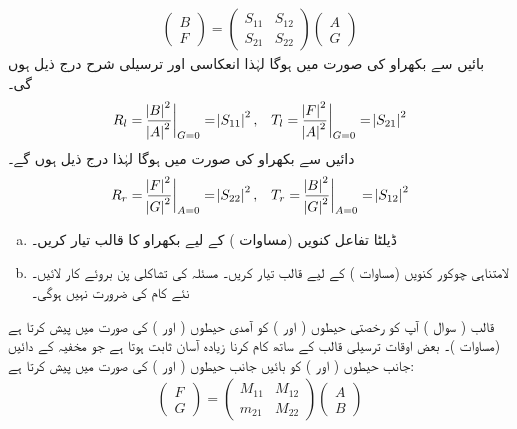 \begin{align}\label{مساوات_غیر_تابع_شروڈنگر_قالب_بکھراو_بی_ایف}
	\begin{pmatrix}
		B\\
		F
	\end{pmatrix}
	=
	\begin{pmatrix}
		S_{11} & S_{12}\\
		S_{21} & S_{22}
	\end{pmatrix}
	\begin{pmatrix}
		A\\
		G
	\end{pmatrix}
\end{align}
بائیں سے بکھراو کی صورت میں  ہوگا لہٰذا انعکاسی اور ترسیلی شرح درج ذیل ہوں گی۔
\begin{align}\label{مساوات_غیر_تابع_شروڈنگر_آر_ایس}
	R_l=\frac{\abs{B}^2}{\abs{A}^2}\bigg|_{G=0}=\abs{S_{11}}^2,&& T_l=\frac{\abs{F}^2}{\abs{A}^2}\bigg|_{G=0}=\abs{S_{21}}^2
\end{align}
دائیں سے بکھراو کی صورت میں  ہوگا لہٰذا درج ذیل ہوں گے۔
\begin{align}\label{مساوات_غیر_تابع_شروڈنگر_آر_ٹی}
	R_r=\frac{\abs{F}^2}{\abs{G}^2}\bigg|_{A=0}=\abs{S_{22}}^2,&& T_r=\frac{\abs{B}^2}{\abs{G}^2}\bigg|_{A=0}=\abs{S_{12}}^2
\end{align}
%
\begin{enumerate}[a.]
\item
 ڈیلٹا تفاعل کنویں  (مساوات ) کے لیے بکھراو کا قالب   تیار کریں۔
\item
 لامتناہی چوکور کنویں  (مساوات ) کے لیے قالب  تیار کریں۔  مسئلہ کی تشاکلی پن بروئے  کار لائیں۔ نئے کام کی ضرورت نہیں ہوگی۔ 
\end{enumerate}
 قالب ( سوال )  آپ کو رخصتی حیطوں (  اور ) کو آمدی حیطوں ( اور ) کی صورت میں پیش کرتا ہے (مساوات )۔ بعض اوقات ترسیلی قالب  کے ساتھ کام کرنا زیادہ آسان ثابت ہوتا ہے جو مخفیہ کے دائیں جانب حیطوں ( اور ) کو بائیں جانب حیطوں ( اور ) کی صورت میں پیش کرتا ہے:
\begin{align}
	\begin{pmatrix}
		F\\
		G
	\end{pmatrix}
	=
	\begin{pmatrix}
		M_{11} & M_{12} \\
		m_{21} & M_{22}
	\end{pmatrix}
	\begin{pmatrix}
		A\\
		B
	\end{pmatrix}
\end{align}
